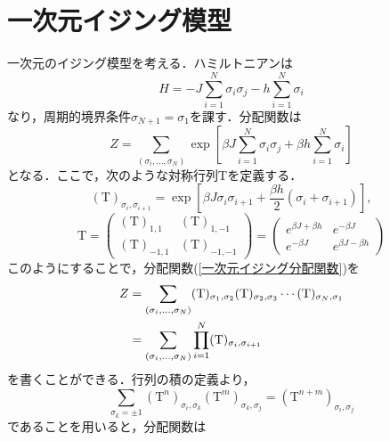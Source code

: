 \documentclass[a4paper,11pt]{jsreport}
\begin{document}
\section{一次元イジング模型}
一次元のイジング模型を考える．ハミルトニアンは
\begin{equation}
  H = -J \sum_{i=1}^N \sigma_i \sigma_j - h \sum_{i=1}^N \sigma_i \label{一次元イジングエネルギー}
\end{equation}
なり，周期的境界条件$\sigma_{N+1} = \sigma_{1}$を課す．分配関数は
\begin{equation}
  Z = \sum_{(\sigma_i,\dots,\sigma_N)} \exp{\left[ \beta J \sum_{i=1}^N \sigma_i \sigma_j + \beta h \sum_{i=1}^N \sigma_i \right]} \label{一次元イジング分配関数}
\end{equation}
となる．ここで，次のような対称行列$\mathrm{T}$を定義する．
\begin{equation}
  (\mathrm{T})_{\sigma_i, \sigma_{i+1}} = \exp{\left[ \beta J \sigma_i \sigma_{i+1} + \frac{\beta h}{2}(\sigma_i + \sigma_{i+1}) \right]},
\end{equation}
\begin{equation}
  \mathrm{T} = \begin{pmatrix}
    (\mathrm{T})_{1,1}  & (\mathrm{T})_{1,-1}  \\
    (\mathrm{T})_{-1,1} & (\mathrm{T})_{-1,-1}
  \end{pmatrix}=
  \begin{pmatrix}
    e^{\beta J + \beta h} & e^{-\beta J}          \\
    e^{-\beta J}          & e^{\beta J - \beta h}
  \end{pmatrix}
\end{equation}
このようにすることで，分配関数(\ref{一次元イジング分配関数})を
\begin{align}
  Z
   & = \sum_{(\sigma_i,\dots,\sigma_N)} (\mathrm{T})_{\sigma_1, \sigma_2} (\mathrm{T})_{\sigma_2, \sigma_3} \cdots (\mathrm{T})_{\sigma_N, \sigma_1} \notag \\
   & = \sum_{(\sigma_i,\dots,\sigma_N)} \prod_{i = 1}^N (\mathrm{T})_{\sigma_i, \sigma_{i+1}}
\end{align}
を書くことができる．行列の積の定義より，
\begin{equation}
  \sum_{\sigma_k = \pm{1}}(\mathrm{T}^n)_{\sigma_i, \sigma_k}(\mathrm{T}^m)_{\sigma_k, \sigma_j}
  = (\mathrm{T}^{n+m})_{\sigma_i, \sigma_j}
\end{equation}
であることを用いると，分配関数は
\end{document}
